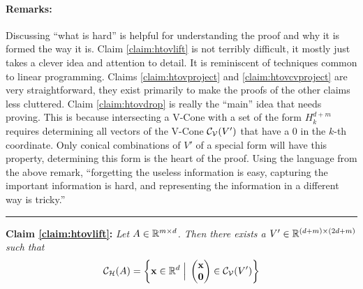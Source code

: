 \documentclass[a4,fleqn]{article}
\begin{document}
\paragraph{Remarks:}  Discussing ``what is hard'' is helpful for understanding the proof and why it is formed the way it is.  Claim \ref{claim:htovlift} is not terribly difficult, it mostly just takes a clever idea and attention to detail.  It is reminiscent of techniques common to linear programming.  Claims \ref{claim:htovproject} and \ref{claim:htovcvproject} are very straightforward, they exist primarily to make the proofs of the other claims less cluttered.  Claim \ref{claim:htovdrop} is really the ``main'' idea that needs proving.  This is because intersecting a V-Cone with a set of the form $H_k^{d+m}$ requires determining all vectors of the V-Cone $\mathcal{C}_{\mathcal{V}}(V')$ that have a $0$ in the $k$-th coordinate.  Only conical combinations of $V'$ of a special form will have this property, determining this form is the heart of the proof.  Using the language from the above remark, ``forgetting the useless information is easy, capturing the important information is hard, and representing the information in a different way is tricky.''

\bigskip \hrule
\bigskip
\textbf{Claim \ref{claim:htovlift}:} \textit{ Let $A \in \mathbb{R}^{m \times d}$.  Then there exists a $V' \in \mathbb{R}^{(d+m) \times (2d+m)}$ such that}
  \[\CH(A) =  \left\{ \x \in \R^d \Suchthat 
              \svec{\x}{\vec{0}} \in \CV(V') \right\}
  \]
\end{document}
